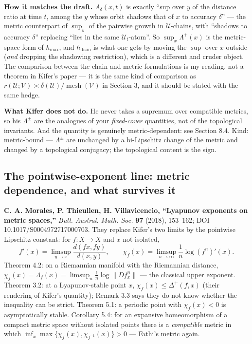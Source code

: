 \documentclass[
]{article}
\begin{document}
\textbf{How it matches the draft.} \(A_\delta(x,t)\) is exactly ``sup
over \(y\) of the distance ratio at time \(t\), among the \(y\) whose
orbit shadows that of \(x\) to accuracy \(\delta\)'' --- the metric
counterpart of \(\sup_y\) of the pairwise growth in
\(\mathcal U\)-chains, with ``shadows to accuracy \(\delta\)'' replacing
``lies in the same \(\mathcal U_t\)-atom''. So \(\sup_x\Lambda^+(x)\) is
the metric-space form of \(h_{\max}\), and \(h_{\mathrm{diam}}\) is what
one gets by moving the \(\sup\) over \(x\) outside (\emph{and} dropping
the shadowing restriction), which is a different and cruder object. The
comparison between the chain and metric formulations is my reading, not
a theorem in Kifer's paper --- it is the same kind of comparison as
\(r(\mathcal U;\mathcal V)\asymp\delta(\mathcal U)/\operatorname{mesh}(\mathcal V)\)
in Section 3, and it should be stated with the same hedge.

\textbf{What Kifer does not do.} He never takes a supremum over
compatible metrics, so his \(\Lambda^\pm\) are the analogues of your
\emph{fixed-cover} quantities, not of the topological invariants. And
the quantity is genuinely metric-dependent: see Section 8.4. Kind: metric-bound
--- \(\Lambda^\pm\) are unchanged by a bi-Lipschitz change of the metric
and changed by a topological conjugacy; the topological content is the
sign.

\subsection{The pointwise-exponent line: metric dependence, and what
survives
it}\label{the-pointwise-exponent-line-metric-dependence-and-what-survives-it}

\textbf{C. A. Morales, P. Thieullen, H. Villavicencio, ``Lyapunov
exponents on metric spaces,''} \emph{Bull. Austral. Math. Soc.}
\textbf{97} (2018), 153--162; DOI 10.1017/S0004972717000703. They
replace Kifer's two limits by the pointwise Lipschitz constant: for
\(f:X\to X\) and \(x\) not isolated, \[
f'(x)=\limsup_{y\to x}\frac{d(fx,fy)}{d(x,y)},\qquad
\chi_f(x)=\limsup_{n\to\infty}\frac1n\log (f^n)'(x).
\] Theorem 4.2: on a Riemannian manifold with the Riemannian distance,
\(\chi_f(x)=\Lambda_f(x)=\limsup_n\frac1n\log\|Df^n_x\|\) --- the
classical upper exponent. Theorem 3.2: at a Lyapunov-stable point \(x\),
\(\chi_f(x)\le\Delta^+(f,x)\) (their rendering of Kifer's quantity);
Remark 3.3 says they do not know whether the inequality can be strict.
Theorem 5.1: a periodic point with \(\chi_f(x)<0\) is asymptotically
stable. Corollary 5.4: for an expansive homeomorphism of a compact
metric space without isolated points there is a \emph{compatible} metric
in which \(\inf_x\max\{\chi_f(x),\chi_{f^{-1}}(x)\}>0\) --- Fathi's
metric again.
\end{document}

